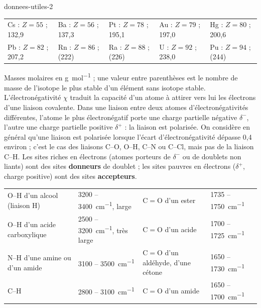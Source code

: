 \begin{blocEdition}{donnees-utiles-2}
\fontsize{10}{13.5}\selectfont
\label{figedition-donnees-2}
{\small\begin{tabularx}{\linewidth}{@{}YYYYY@{}}\toprule
Cs : $Z=55$ ; 132,9 & Ba : $Z=56$ ; 137,3 & Pt : $Z=78$ ; 195,1 & Au : $Z=79$ ; 197,0 & Hg : $Z=80$ ; 200,6 \\
Pb : $Z=82$ ; 207,2 & Rn : $Z=86$ ; (222) & Ra : $Z=88$ ; (226) & U : $Z=92$ ; 238,0 & Pu : $Z=94$ ; (244) \\\bottomrule
\end{tabularx}}\par\smallskip
{\small Masses molaires en \unit{g.mol^{-1}} ; une valeur entre parenthèses est le nombre de masse de l'isotope le plus stable d'un
élément sans isotope stable.}
L'électronégativité $\chi$ traduit la capacité d'un atome à attirer vers lui les électrons d'une liaison covalente. Dans une
liaison entre deux atomes d'électronégativités différentes, l'atome le plus électronégatif porte une charge partielle
négative $\delta^-$, l'autre une charge partielle positive $\delta^+$ : la liaison est polarisée. On considère en général qu'une
liaison est polarisée lorsque l'écart d'électronégativité dépasse 0,4 environ ; c'est le cas des liaisons C--O, O--H, C--N
ou C--Cl, mais pas de la liaison C--H. Les sites riches en électrons (atomes porteurs de $\delta^-$ ou de doublets non liants)
sont des sites \textbf{donneurs} de doublet ; les sites pauvres en électrons ($\delta^+$, charge positive) sont des sites
\textbf{accepteurs}.
{\small\begin{tabularx}{\linewidth}{@{}Yl|Yl@{}}\toprule
O--H d'un alcool (liaison H) & 3200 -- \qty{3400}{cm^{-1}}, large & C$=$O d'un ester & 1735 -- \qty{1750}{cm^{-1}} \\
O--H d'un acide carboxylique & 2500 -- \qty{3200}{cm^{-1}}, très large & C$=$O d'un acide & 1700 -- \qty{1725}{cm^{-1}} \\
N--H d'une amine ou d'un amide & 3100 -- \qty{3500}{cm^{-1}} & C$=$O d'un aldéhyde, d'une cétone & 1650 -- \qty{1730}{cm^{-1}} \\
C--H & 2800 -- \qty{3100}{cm^{-1}} & C$=$O d'un amide & 1650 -- \qty{1700}{cm^{-1}} \\\bottomrule
\end{tabularx}}
\end{blocEdition}

